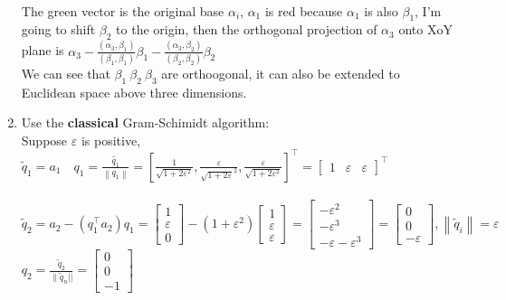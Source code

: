 \documentclass[english,onecolumn]{IEEEtran}
\begin{document}
\begin{enumerate}
\\The green vector is the original base $\alpha_{i}$, $\alpha_{1}$ is red because $\alpha_{1}$ is also $\beta_{1}$, I'm going to shift  $\beta_{2}$ to the origin, then the orthogonal projection of  $\alpha_{3}$ onto XoY plane is $\alpha_{3}-\frac{\left(\alpha_{3}, \beta_{1}\right)}{\left(\beta_{1}, \beta_{1}\right)} \beta_{1}-\frac{\left(\alpha_{3}, \beta_{2}\right)}{\left(\beta_{2}, \beta_{2}\right)} \beta_{2}$
\\We can see that $\beta_{1}\ \beta_{2}\  \beta_{3}$ are orthoogonal, it can also be extended to Euclidean space above three dimensions.

\item  Use the \textbf{classical} Gram-Schimidt algorithm: \\
Suppose $\varepsilon$ is positive,\\
$\tilde{q}_{1}=a_{1} \quad q_{1}=\frac{\hat{q}_{1}}{\left\|q_{1}\right\|}=\left[\frac{1}{\sqrt{1+2 \varepsilon^{2}}}, \frac{\varepsilon}{\sqrt{1+2 \varepsilon}^{2}}, \frac{\varepsilon}{\sqrt{1+2 \varepsilon^{2}}}\right]^{\top}=\left[\begin{array}{lll}1 & \varepsilon & \varepsilon\end{array}\right]^{\top}$
\\ \\
$\tilde{q}_{2}=a_{2}-\left(q_{1}^{\top} a_{2}\right) q_{1}=\left[\begin{array}{c}1 \\ \varepsilon \\ 0\end{array}\right]-\left(1+\varepsilon^{2}\right)\left[\begin{array}{c}1 \\ \varepsilon \\ \varepsilon\end{array}\right]=\left[\begin{array}{c}-\varepsilon^{2} \\ -\varepsilon^{3} \\ -\varepsilon-\varepsilon^{3}\end{array}\right]=\left[\begin{array}{c}0 \\ 0 \\ -\varepsilon\end{array}\right],\left\|\tilde{q}_{i}\right\|=\varepsilon$
\\$q_{2}=\frac{\tilde{q}_{2}}{\| \tilde{q}_{n}||}=\left[\begin{array}{c}0 \\ 0 \\ -1\end{array}\right]$

\end{enumerate}
\end{document}
